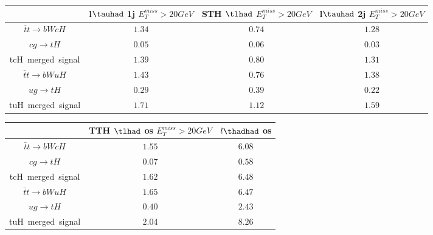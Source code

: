 \centering
\begin{tabular}{|c|c|c|c|} \hline
 & l$\tauhad$ 1j  $E_T^{miss}>20GeV$ & STH $\tlhad$   $E_T^{miss}>20GeV$ & l$\tauhad$ 2j  $E_T^{miss}>20GeV$\\\hline
$\bar{t}t\to bWcH$ & $1.34$ & $0.74$ & $1.28$\\\hline
$cg\to tH$ & $0.05$ & $0.06$ & $0.03$\\\hline
tcH~merged~signal & $1.39$ & $0.80$ & $1.31$\\\hline
$\bar{t}t\to bWuH$ & $1.43$ & $0.76$ & $1.38$\\\hline
$ug\to tH$ & $0.29$ & $0.39$ & $0.22$\\\hline
tuH~merged~signal & $1.71$ & $1.12$ & $1.59$\\\hline
\end{tabular}
\begin{tabular}{|c|c|c|} \hline
 & TTH $\tlhad$ os  $E_T^{miss}>20GeV$ & $l\thadhad$ os\\\hline
$\bar{t}t\to bWcH$ & $1.55$ & $6.08$\\\hline
$cg\to tH$ & $0.07$ & $0.58$\\\hline
tcH~merged~signal & $1.62$ & $6.48$\\\hline
$\bar{t}t\to bWuH$ & $1.65$ & $6.47$\\\hline
$ug\to tH$ & $0.40$ & $2.43$\\\hline
tuH~merged~signal & $2.04$ & $8.26$\\\hline
\end{tabular}
